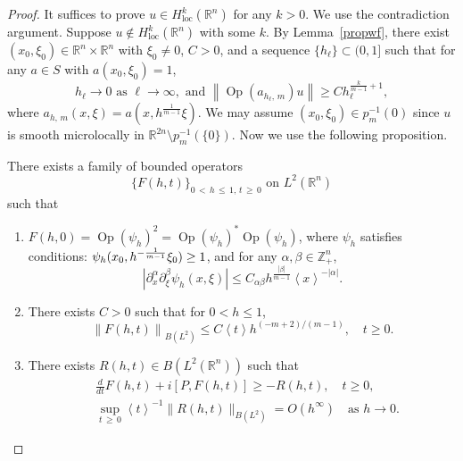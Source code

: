 \documentclass[AHL,Unicode,longabstracts,published]{cedram}
\renewcommand*\a{\alpha}
\renewcommand*\b{\beta}
\newcommand*\g{\psi}
\newcommand*\x{\xi}
\DeclareMathOperator{\Op}{Op}
\newcommand*\re{\mathbb{R}}
\newcommand*\ze{\mathbb{Z}}
\newcommand*\pa{\partial}
\DeclareMathOperator{\loc}{loc}
\newcommand{\jap}[1]{\left\langle #1 \right\rangle}
\begin{document}
\begin{proof}
It suffices to prove $u\in H^k_{\loc}(\re^n)$ for any $k>0$. We use the contradiction argument. Suppose $u\notin H_{\loc}^{k}(\re^n)$ with some $k$. By Lemma~\ref{propwf}, there exist $(x_0, \x_0)\in \re^n \times \re^n$ with $\x_0 \ne 0$, $C>0$, and a sequence $\{h_\ell\}\subset (0, 1]$ such that for any $a\in S$ with $a(x_0, \x_0) = 1 $,
\[
h_{\ell} \to 0 \text{ as } \ell \to \infty, \text{ and }\left\| \Op(a_{h_{\ell},\,m})u\right\| \geq Ch_{\ell}^{\frac{k}{m-1}+1},
\]
where $a_{h,\,m}(x,\x)=a(x,h^{\frac{1}{m-1}}\x)$. We may assume $(x_0,\x_0) \in p_m^{-1}(0)$ since $u$ is smooth microlocally in $\re^{2n}\setminus p_m^{-1}(\{0\})$. Now we use the following proposition.


\begin{prop}\label{singprop}
There exists a family of bounded operators
\[
\{F(h,t)\}_{0\,<\,h\,\leq\,1,\,t\,\geq\,0}\text{ on }L^2(\re^n)
\]
such that
\begin{enumerate}
\item $F(h,0)=\Op(\g_{h})^2=\Op(\g_h)^*\Op(\g_h)$, where $\g_h$ satisfies conditions: $\g_h(x_0,\linebreak h^{-\frac{1}{m-1}}\x_0)\geq 1$, and for any $\a,\b\in\ze_+^n$,
\[
\left|\pa_{x}^{\a}\pa_{\x}^{\b}\g_{h}(x,\x)\right|\leq C_{\a\b}h^{\frac{|\b|}{m-1}}\jap{x}^{-|\a|}.
\]
\item There exists $C>0$ such that for $0<h\leq 1$,
\[
\left\|F(h,t)\right\|_{B(L^2)}\leq C\jap{t}h^{(-m+2)/(m-1)}, \quad t\geq 0.
\]
\item There exists $R(h,t)\in B(L^2(\re^n))$ such that
\begin{align*}
&\frac{d}{dt}F(h,t)+i[P,F(h,t)]\geq -R(h,t),\quad t\geq 0, \\
& \sup_{t\,\geq\,0}\jap{t}^{-1}\|R(h,t)\|_{B(L^2)}=O(h^{\infty})
\quad\text{as }h\to 0.
\end{align*}
\end{enumerate}
\end{prop}



\end{proof}
\end{document}
